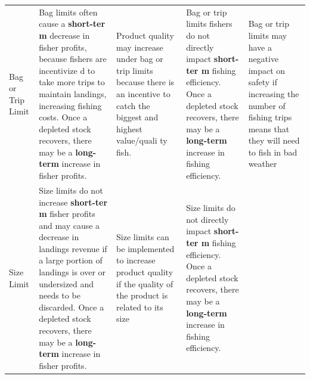 \documentclass[]{book}
\begin{document}
\begin{longtable}[]{@{}lllll@{}}
\begin{minipage}[t]{0.17\columnwidth}
Bag or Trip Limit\strut
\end{minipage} & \begin{minipage}[t]{0.17\columnwidth}\raggedright\strut
Bag limits often cause a \textbf{short-ter m} decrease in fisher
profits, because fishers are incentivize d to take more trips to
maintain landings, increasing fishing costs. Once a depleted stock
recovers, there may be a \textbf{long-term } increase in fisher
profits.\strut
\end{minipage} & \begin{minipage}[t]{0.17\columnwidth}\raggedright\strut
Product quality may increase under bag or trip limits because there is
an incentive to catch the biggest and highest value/quali ty fish.\strut
\end{minipage} & \begin{minipage}[t]{0.17\columnwidth}\raggedright\strut
Bag or trip limits fishers do not directly impact \textbf{short-ter m}
fishing efficiency. Once a depleted stock recovers, there may be a
\textbf{long-term } increase in fishing efficiency.\strut
\end{minipage} & \begin{minipage}[t]{0.17\columnwidth}\raggedright\strut
Bag or trip limits may have a negative impact on safety if increasing
the number of fishing trips means that they will need to fish in bad
weather\strut
\end{minipage}\tabularnewline
\begin{minipage}[t]{0.17\columnwidth}\raggedright\strut
Size Limit\strut
\end{minipage} & \begin{minipage}[t]{0.17\columnwidth}\raggedright\strut
Size limits do not increase \textbf{short-ter m} fisher profits and may
cause a decrease in landings revenue if a large portion of landings is
over or undersized and needs to be discarded. Once a depleted stock
recovers, there may be a \textbf{long-term } increase in fisher
profits.\strut
\end{minipage} & \begin{minipage}[t]{0.17\columnwidth}\raggedright\strut
Size limits can be implemented to increase product quality if the
quality of the product is related to its size\strut
\end{minipage} & \begin{minipage}[t]{0.17\columnwidth}\raggedright\strut
Size limits do not directly impact \textbf{short-ter m} fishing
efficiency. Once a depleted stock recovers, there may be a
\textbf{long-term } increase in fishing efficiency.\strut

\end{minipage}
\end{longtable}
\end{document}
